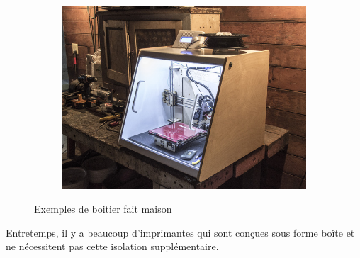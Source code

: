 \documentclass[11pt,a4paper]{article}
\begin{document}
\begin{figure}[H]
\begin{subfigure}[b]{0.3\textwidth}
    \end{subfigure}
    \quad %
    \begin{subfigure}[b]{0.3\textwidth}
        \includegraphics[width=\textwidth,cfbox=azul_marcos 4pt 0pt]{FOTOS/CERRAMIENTO3}
    \end{subfigure}
    \caption*{Exemples de boitier fait maison }
\end{figure}
Entretemps, il y a beaucoup d’imprimantes qui sont conçues sous forme boîte et ne nécessitent pas cette isolation supplémentaire.
\end{document}
